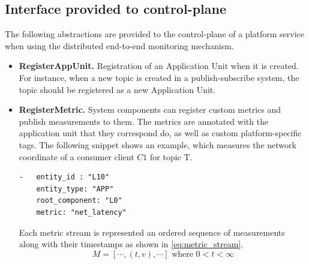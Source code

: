 \subsection{Interface provided to control-plane}
The following abstractions are provided to the control-plane of a platform service when using the distributed end-to-end monitoring mechanism.
\begin{itemize}
\item \textbf{RegisterAppUnit.} Registration of an Application Unit when it is created. For instance, when a new topic is created in a publish-subscribe system, the topic should be registered as a new Application Unit.
\item \textbf{RegisterMetric.} System components can register custom metrics and publish measurements to them. The metrics are annotated with the application unit that they correspond do, as well as custom platform-specific tags. The following snippet shows an example, which measures the network coordinate of a consumer client $C1$ for topic T.
\begin{verbatim}
-   entity_id : "L10"
    entity_type: "APP"
    root_component: "L0"
    metric: "net_latency"
\end{verbatim}
Each metric stream is represented an ordered sequence of measurements along with their timestamps as shown in \cref{eq:metric_stream}.
\begin{equation}
M = \left[ \cdots , \left( t, v \right) , \cdots \right] \text{ where } 0 < t < \infty
\label{eq:metric_stream}
\end{equation}


\end{itemize}
